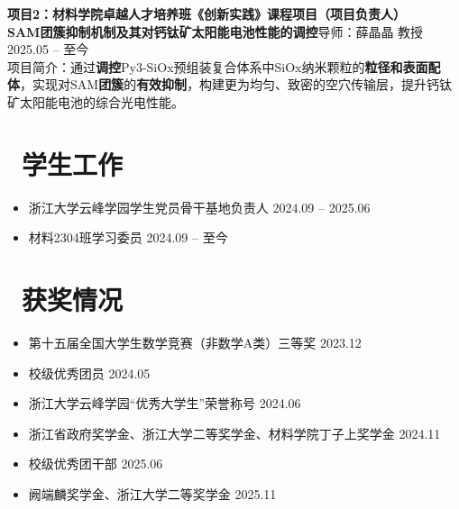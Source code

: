 \documentclass[11pt]{article}
\newlength{\interProjectSpacing}
\newcommand{\projectsep}{\vspace{\interProjectSpacing}}
\newlength{\intraProjectTitleSep}
\newcommand{\titlebreak}{\\[\intraProjectTitleSep]}
\newlength{\intraProjectListTopSep}
\begin{document}
\projectsep

\textbf{项目2：材料学院卓越人才培养班《创新实践》课程项目（项目负责人）}\\
\textbf{SAM团簇抑制机制及其对钙钛矿太阳能电池性能的调控}\qquad 导师：薛晶晶 教授 \hfill 2025.05 -- 至今 \titlebreak
项目简介：通过\textbf{调控}Py3-SiOx预组装复合体系中SiOx纳米颗粒的\textbf{粒径和表面配体}，实现对SAM\textbf{团簇}的\textbf{有效抑制}，构建更为均匀、致密的空穴传输层，提升钙钛矿太阳能电池的综合光电性能。

\section{\makebox[\widthof{\faUsers}][c]{\color{CVBlue}\faUsers}\ 学生工作}
\begin{itemize}
    \item 浙江大学云峰学园学生党员骨干基地\quad 负责人 \hfill 2024.09 -- 2025.06
    \item 材料2304班\quad 学习委员 \hfill 2024.09 -- 至今
\end{itemize}

\section{\makebox[\widthof{\faGraduationCap}][c]{\color{CVBlue}\faList}\ 获奖情况}
\begin{itemize}
    \item 第十五届全国大学生数学竞赛（非数学A类）三等奖 \hfill 2023.12
    \item 校级优秀团员 \hfill 2024.05
    \item 浙江大学云峰学园“优秀大学生”荣誉称号 \hfill 2024.06
    \item 浙江省政府奖学金、浙江大学二等奖学金、材料学院丁子上奖学金 \hfill 2024.11
    \item 校级优秀团干部 \hfill 2025.06
    \item 阙端麟奖学金、浙江大学二等奖学金 \hfill 2025.11
\end{itemize}
    
\end{document}
